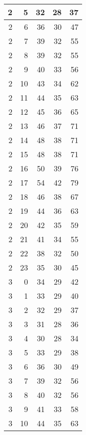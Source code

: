 \begin{longtable}{|r|r|r|r|r|}
    2     & 5     & 32    & 28    & 37 \\\hline
    2     & 6     & 36    & 30    & 47 \\\hline
    2     & 7     & 39    & 32    & 55 \\\hline
    2     & 8     & 39    & 32    & 55 \\\hline
    2     & 9     & 40    & 33    & 56 \\\hline
    2     & 10    & 43    & 34    & 62 \\\hline
    2     & 11    & 44    & 35    & 63 \\\hline
    2     & 12    & 45    & 36    & 65 \\\hline
    2     & 13    & 46    & 37    & 71 \\\hline
    2     & 14    & 48    & 38    & 71 \\\hline
    2     & 15    & 48    & 38    & 71 \\\hline
    2     & 16    & 50    & 39    & 76 \\\hline
    2     & 17    & 54    & 42    & 79 \\\hline
    2     & 18    & 46    & 38    & 67 \\\hline
    2     & 19    & 44    & 36    & 63 \\\hline
    2     & 20    & 42    & 35    & 59 \\\hline
    2     & 21    & 41    & 34    & 55 \\\hline
    2     & 22    & 38    & 32    & 50 \\\hline
    2     & 23    & 35    & 30    & 45 \\\hline
    3     & 0     & 34    & 29    & 42 \\\hline
    3     & 1     & 33    & 29    & 40 \\\hline
    3     & 2     & 32    & 29    & 37 \\\hline
    3     & 3     & 31    & 28    & 36 \\\hline
    3     & 4     & 30    & 28    & 34 \\\hline
    3     & 5     & 33    & 29    & 38 \\\hline
    3     & 6     & 36    & 30    & 49 \\\hline
    3     & 7     & 39    & 32    & 56 \\\hline
    3     & 8     & 40    & 32    & 56 \\\hline
    3     & 9     & 41    & 33    & 58 \\\hline
    3     & 10    & 44    & 35    & 63 \\\hline

\end{longtable}
